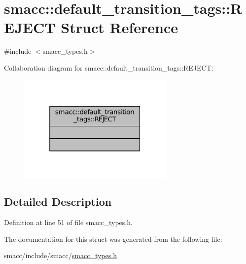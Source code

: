 \hypertarget{structsmacc_1_1default__transition__tags_1_1REJECT}{}\section{smacc\+:\+:default\+\_\+transition\+\_\+tags\+:\+:R\+E\+J\+E\+CT Struct Reference}
\label{structsmacc_1_1default__transition__tags_1_1REJECT}


{\ttfamily \#include $<$smacc\+\_\+types.\+h$>$}



Collaboration diagram for smacc\+:\+:default\+\_\+transition\+\_\+tags\+:\+:R\+E\+J\+E\+CT\+:
\nopagebreak
\begin{figure}[H]
\begin{center}
\leavevmode
\includegraphics[width=217pt]{structsmacc_1_1default__transition__tags_1_1REJECT__coll__graph}
\end{center}
\end{figure}


\subsection{Detailed Description}


Definition at line 51 of file smacc\+\_\+types.\+h.



The documentation for this struct was generated from the following file\+:\begin{DoxyCompactItemize}
\item 
smacc/include/smacc/\hyperlink{smacc__types_8h}{smacc\+\_\+types.\+h}\end{DoxyCompactItemize}
